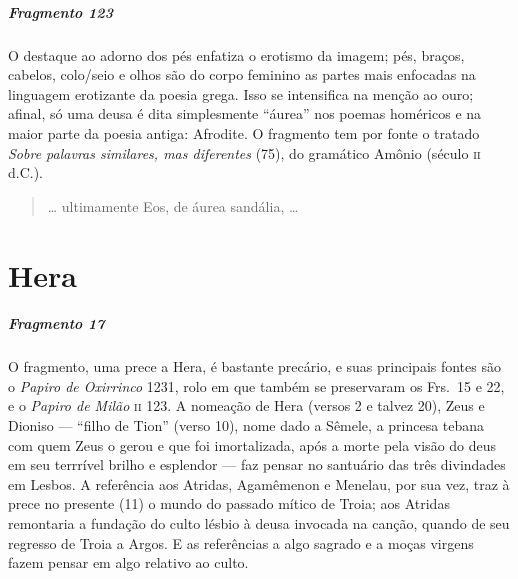 \paragraph{Fragmento 123}

{\small O destaque ao adorno dos pés enfatiza o erotismo da imagem; pés, braços,
cabelos, colo/seio e olhos são do corpo feminino as partes mais enfocadas na
linguagem erotizante da poesia grega. Isso se intensifica na menção ao ouro;
afinal, só uma deusa é dita simplesmente ``áurea” nos poemas homéricos
e na maior parte da poesia antiga: Afrodite. O fragmento tem por fonte o
tratado \textit{Sobre palavras similares, mas diferentes} (75), do gramático Amônio
(século \textsc{ii} d.C.).}

\begin{verse}
\ldots{} ultimamente Eos, de áurea sandália, \ldots{}
\end{verse}


\chapter{Hera}

\paragraph{Fragmento 17}

{\small O fragmento, uma prece a Hera, é bastante precário, e suas principais fontes são o \textit{Papiro de Oxirrinco} 1231, rolo em que também se preservaram os Frs.~15 e 22, e o \textit{Papiro de Milão} \textsc{ii} 123. A nomeação de Hera (versos 2 e talvez 20), Zeus e Dioniso --- ``filho de Tion'' (verso 10), nome dado a Sêmele, a princesa tebana com quem Zeus o gerou e que foi imortalizada, após a morte pela visão do deus em seu terrrível brilho e esplendor --- faz pensar no santuário das três divindades em Lesbos. A referência aos Atridas, Agamêmenon e Menelau, por sua vez, traz à prece no presente (11) o mundo do passado mítico de Troia; aos Atridas remontaria a fundação do culto lésbio à deusa invocada na canção, quando de seu regresso de Troia a Argos. E as referências a algo sagrado e a moças virgens fazem pensar em algo relativo ao culto.}

